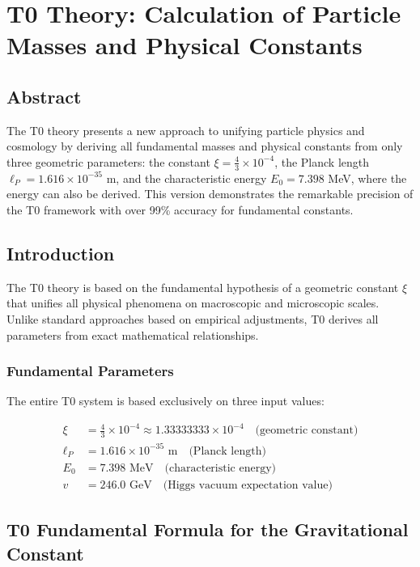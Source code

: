 \chapter{	\textbf{T0 Theory: Calculation of Particle Masses and Physical Constants}}

\section*{Abstract}
		The T0 theory presents a new approach to unifying particle physics and cosmology by deriving all fundamental masses and physical constants from only three geometric parameters: the constant $\xi = \frac{4}{3} \times 10^{-4}$, the Planck length $\ell_P = 1.616 \times 10^{-35}$ m, and the characteristic energy $E_0 = 7.398$ MeV, where the energy can also be derived. This version demonstrates the remarkable precision of the T0 framework with over 99\% accuracy for fundamental constants.

	
	
	\section{Introduction}
	
	The T0 theory is based on the fundamental hypothesis of a geometric constant $\xi$ that unifies all physical phenomena on macroscopic and microscopic scales. Unlike standard approaches based on empirical adjustments, T0 derives all parameters from exact mathematical relationships.
	
	\subsection{Fundamental Parameters}
	
	The entire T0 system is based exclusively on three input values:
	
	\begin{align}
		\xi &= \frac{4}{3} \times 10^{-4} \approx 1.33333333 \times 10^{-4} \quad \text{(geometric constant)} \\
		\ell_P &= 1.616 \times 10^{-35} \text{ m} \quad \text{(Planck length)} \\
		E_0 &= 7.398 \text{ MeV} \quad \text{(characteristic energy)} \\
		v &= 246.0 \text{ GeV} \quad \text{(Higgs vacuum expectation value)}
	\end{align}
	
	\section{T0 Fundamental Formula for the Gravitational Constant}
	
